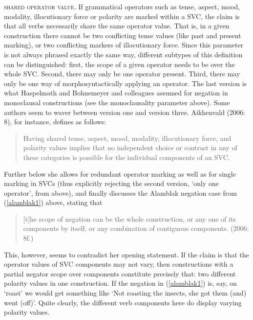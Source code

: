 \textsc{shared operator value}. If grammatical operators such as tense, aspect, mood, modality, illocutionary force or polarity are marked within a SVC, the claim is that all verbs necessarily share the same operator value. That is, in a given construction there cannot be two conflicting tense values (like past and present marking), or two conflicting markers of illocutionary force. Since this parameter is not always phrased exactly the same way, different subtypes of this definition can be distinguished: first, the scope of a given operator needs to be over the whole SVC. Second, there may only be one operator present. Third, there may only be one way of morphosyntactically applying an operator. The last version is what Haspelmath and Bohnemeyer and colleagues assumed for negation in monoclausal constructions (see the monoclausality parameter above). Some authors seem to waver between version one and version three. Aikhenvald (2006: 8), for instance, defines as follows: 

\begin{quote}Having shared tense, aspect, mood, modality, illocutionary force, and polarity values implies that no independent choice or contrast in any of these categories is possible for the individual components of an SVC. \end{quote}


Further below she allows for redundant operator marking as well as for single marking in SVCs (thus explicitly rejecting the second version, `only one operator', from above), and finally discusses the Alamblak negation case from (\ref{alamblak1}) above, stating that \begin{quote}[t]he scope of negation can be the whole construction, or any one of its components by itself, or any combination of contiguous components. (2006: 8f.)\end{quote}

This, however, seems to contradict her opening statement. If the claim is that the operator values of SVC components may not vary, then constructions with a partial negator scope over components constitute precisely that: two different polarity values in one construction. If the negation in (\ref{alamblak1}) is, say, on `roast' we would get something like `Not roasting the insects, she got them (and) went (off)'. Quite clearly, the different verb components here do display varying polarity values.


